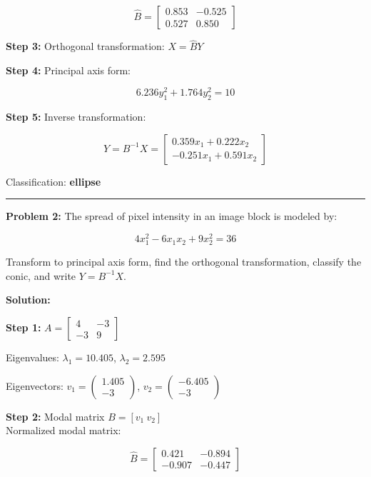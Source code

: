 \documentclass[
  letterpaper,
  DIV=11,
  numbers=noendperiod]{scrreprt}
\begin{document}
\[
\hat{B} = \begin{bmatrix}0.853 & -0.525\\0.527 & 0.850\end{bmatrix}
\]

\textbf{Step 3:} Orthogonal transformation: \(X = \hat{B}Y\)

\textbf{Step 4:} Principal axis form:

\[
6.236 y_1^2 + 1.764 y_2^2 = 10
\]

\textbf{Step 5:} Inverse transformation:

\[
Y = B^{-1}X =
\begin{bmatrix}
0.359 x_1 + 0.222 x_2\\
-0.251 x_1 + 0.591 x_2
\end{bmatrix}
\]

Classification: \textbf{ellipse}

\begin{center}\rule{0.5\linewidth}{0.5pt}\end{center}

\textbf{Problem 2:} The spread of pixel intensity in an image block is
modeled by:

\[
4x_1^{2}-6x_1x_2+9x_2^{2}=36
\]

Transform to principal axis form, find the orthogonal transformation,
classify the conic, and write \(Y=B^{-1}X\).

\textbf{Solution:}

\textbf{Step 1:} \(A = \begin{bmatrix}4 & -3\\-3 & 9\end{bmatrix}\)

Eigenvalues: \(\lambda_1 = 10.405\), \(\lambda_2 = 2.595\)

Eigenvectors: \(v_1 = \begin{pmatrix}1.405\\-3\end{pmatrix}\),
\(v_2 = \begin{pmatrix}-6.405\\-3\end{pmatrix}\)

\textbf{Step 2:} Modal matrix \(B = [v_1\ v_2]\)\\
Normalized modal matrix:

\[
\hat{B} = \begin{bmatrix}0.421 & -0.894\\ -0.907 & -0.447\end{bmatrix}
\]
\end{document}
